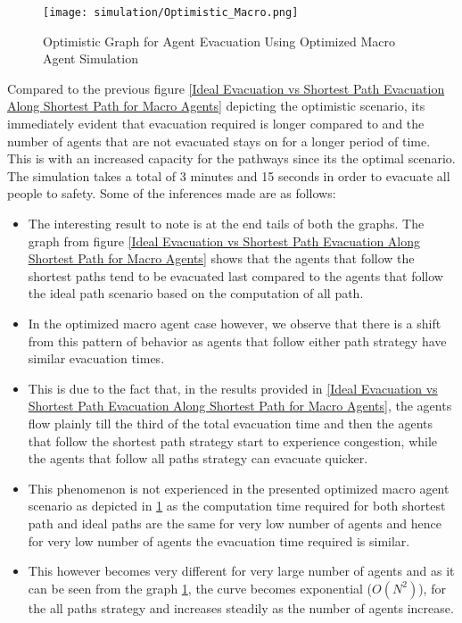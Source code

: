 \begin{figure}[H]
  \centering
  \texttt{[image: simulation/Optimistic\_Macro.png]}
  \caption{Optimistic Graph for Agent Evacuation Using Optimized Macro Agent Simulation}
  \label{Optimistic Graph for Agent Evacuation Using Optimized Macro Agent Simulation}
\end{figure}

Compared to the previous figure \ref{Ideal Evacuation vs Shortest Path Evacuation Along Shortest Path for Macro Agents} depicting the optimistic scenario, its immediately evident that evacuation required is longer compared to and the number of agents that are not evacuated stays on for a longer period of time. This is with an increased capacity for the pathways since its the optimal scenario. The simulation takes a total of 3 minutes and 15 seconds in order to evacuate all people to safety. Some of the inferences made are as follows:

\begin{itemize}
  \item The interesting result to note is at the end tails of both the graphs. The graph from figure \ref{Ideal Evacuation vs Shortest Path Evacuation Along Shortest Path for Macro Agents} shows that the agents that follow the shortest paths tend to be evacuated last compared to the agents that follow the ideal path scenario based on the computation of all path.
  \item In the optimized macro agent case however, we observe that there is a shift from this pattern of behavior as agents that follow either path strategy have similar evacuation times. 
  \item This is due to the fact that, in the results provided in \ref{Ideal Evacuation vs Shortest Path Evacuation Along Shortest Path for Macro Agents}, the agents flow plainly till the third of the total evacuation time and then the agents that follow the shortest path strategy start to experience congestion, while the agents that follow all paths strategy can evacuate quicker.
  \item This phenomenon is not experienced in the presented optimized macro agent scenario as depicted in \ref{Optimistic Graph for Agent Evacuation Using Optimized Macro Agent Simulation} as the computation time required for both shortest path and ideal paths are the same for very low number of agents and hence for very low number of agents the evacuation time required is similar.
  \item This however becomes very different for very large number of agents and as it can be seen from the graph \ref{Optimistic Graph for Agent Evacuation Using Optimized Macro Agent Simulation}, the curve becomes exponential ($O(N^2)$), for the all paths strategy and increases steadily as the number of agents increase.
\end{itemize}

